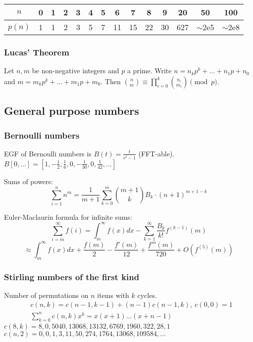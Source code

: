     \begin{center}
    \begin{tabular}{c|c@{\ }c@{\ }c@{\ }c@{\ }c@{\ }c@{\ }c@{\ }c@{\ }c@{\ }c@{\ }c@{\ }c@{\ }c}
      $n$    & 0 & 1 & 2 & 3 & 4 & 5 & 6  & 7  & 8  & 9  & 20  & 50  & 100 \\ \hline
      $p(n)$ & 1 & 1 & 2 & 3 & 5 & 7 & 11 & 15 & 22 & 30 & 627 & $\mathtt{\sim}$2e5 & $\mathtt{\sim}$2e8 \\
    \end{tabular}
    \end{center}

  \subsubsection{Lucas' Theorem}
    Let $n,m$ be non-negative integers and $p$ a prime. Write $n=n_kp^k+...+n_1p+n_0$ and $m=m_kp^k+...+m_1p+m_0$. Then $\binom{n}{m} \equiv \prod_{i=0}^k\binom{n_i}{m_i} \pmod{p}$.


\subsection{General purpose numbers}
  \subsubsection{Bernoulli numbers}
    EGF of Bernoulli numbers is $B(t)=\frac{t}{e^t-1}$ (FFT-able).
    $B[0,\ldots] = [1, -\frac{1}{2}, \frac{1}{6}, 0, -\frac{1}{30}, 0, \frac{1}{42}, \ldots]$

    Sums of powers:
    \small
    \[ \sum_{i=1}^n n^m = \frac{1}{m+1} \sum_{k=0}^m \binom{m+1}{k} B_k \cdot (n+1)^{m+1-k} \]
    \normalsize

    Euler-Maclaurin formula for infinite sums:
    \small
    \[ \sum_{i=m}^{\infty} f(i) = \int_m^\infty f(x) dx - \sum_{k=1}^\infty \frac{B_k}{k!}f^{(k-1)}(m) \]
    \[ \approx \int_{m}^\infty f(x)dx + \frac{f(m)}{2} - \frac{f'(m)}{12} + \frac{f'''(m)}{720} + O(f^{(5)}(m)) \]
    \normalsize

  \subsubsection{Stirling numbers of the first kind}
    Number of permutations on $n$ items with $k$ cycles.
    \begin{align*}
      &c(n,k) = c(n-1,k-1) + (n-1) c(n-1,k),\ c(0,0) = 1 \\
      &\textstyle \sum_{k=0}^n c(n,k)x^k = x(x+1) \dots (x+n-1)
    \end{align*}
    $c(8,k) = 8, 0, 5040, 13068, 13132, 6769, 1960, 322, 28, 1$ \\
    $c(n,2) = 0, 0, 1, 3, 11, 50, 274, 1764, 13068, 109584, \dots$

